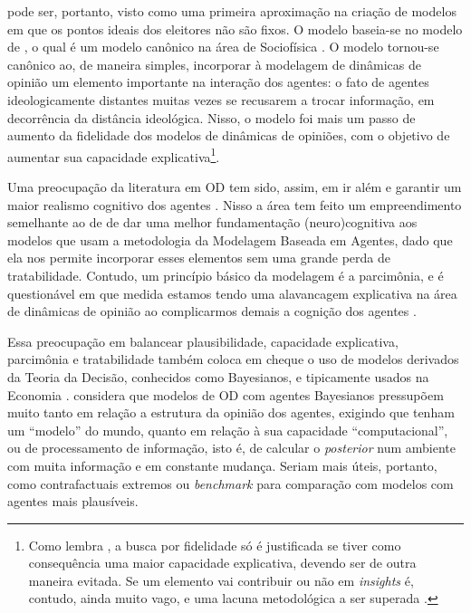  pode ser, portanto, visto como uma primeira
aproximação na criação de modelos em que os pontos ideais dos eleitores não são
fixos. O modelo baseia-se no modelo de , o qual é
um modelo canônico na área de Sociofísica \cite{galam1982sociophysics}. O modelo
tornou-se canônico ao, de maneira simples, incorporar à modelagem de dinâmicas
de opinião um elemento importante na interação dos agentes: o fato de agentes
ideologicamente distantes muitas vezes se recusarem a trocar informação, em
decorrência da distância ideológica. Nisso, o modelo foi mais um passo de
aumento da fidelidade dos modelos de dinâmicas de opiniões, com o objetivo de
aumentar sua capacidade  explicativa\footnote{Como lembra , a busca por
  fidelidade só é justificada se tiver como consequência uma maior capacidade
  explicativa, devendo ser de outra maneira evitada. Se um elemento vai
  contribuir ou não em \textit{insights} é, contudo, ainda muito vago, e uma
  lacuna metodológica a ser superada
  \cite{ragan2010embarrassment}.}. 

Uma preocupação da literatura em OD tem sido, assim, em ir além e garantir um
maior realismo cognitivo dos agentes \cite{duggins2014psychologically,homer2013complex,abrica2017effects}. Nisso a
área tem feito um empreendimento semelhante ao de
 de dar uma melhor fundamentação
(neuro)cognitiva aos modelos que usam a metodologia da Modelagem Baseada em
Agentes, dado que ela nos permite incorporar esses elementos sem uma grande
perda de tratabilidade. Contudo, um princípio básico da modelagem é a
parcimônia, e é questionável em que medida estamos tendo uma alavancagem
explicativa na área de dinâmicas de opinião ao complicarmos demais a cognição
dos agentes \cite{lave1993introduction,sznajd2014person}.

Essa preocupação em balancear plausibilidade, capacidade explicativa, parcimônia
e tratabilidade também coloca em cheque o uso de modelos derivados da Teoria da
Decisão, conhecidos como Bayesianos, e tipicamente usados na Economia
\cite{acemoglu2011opinion}.  considera que
modelos de OD com agentes Bayesianos pressupõem  muito tanto em relação a
estrutura da opinião dos agentes, exigindo que tenham um ``modelo'' do mundo,
quanto em relação à sua capacidade ``computacional'', ou de processamento de
informação, isto é, de calcular o \textit{posterior} num ambiente com muita
informação e em constante mudança. Seriam mais úteis, portanto, como
contrafactuais extremos ou \textit{benchmark} para comparação com modelos com
agentes mais plausíveis.

